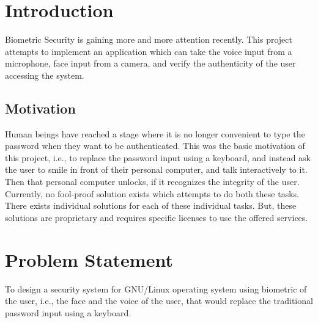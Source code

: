 \chapter{Introduction}
Biometric Security is gaining more and more attention recently. This project
attempts to implement an application which can take the voice input from a
microphone, face input from a camera, and verify the authenticity of the user
accessing the system. \\

\section{Motivation}
Human beings have reached a stage where it is no longer convenient to type the
password when they want to be authenticated. This was the basic motivation of
this project, i.e., to replace the password input using a keyboard, and instead
ask the user to smile in front of their personal computer, and talk interactively
to it. Then that personal computer unlocks, if it recognizes the integrity of
the user. \\
Currently, no fool-proof solution exists which attempts to do both these tasks.
There exists individual solutions for each of these individual tasks. But, these
solutions are proprietary and requires specific licenses to use the offered
services. \\

\chapter{Problem Statement}
To design a security system for GNU/Linux operating system using biometric
of the user, i.e., the face and the voice of the user, that would replace the
traditional password input using a keyboard. \\

